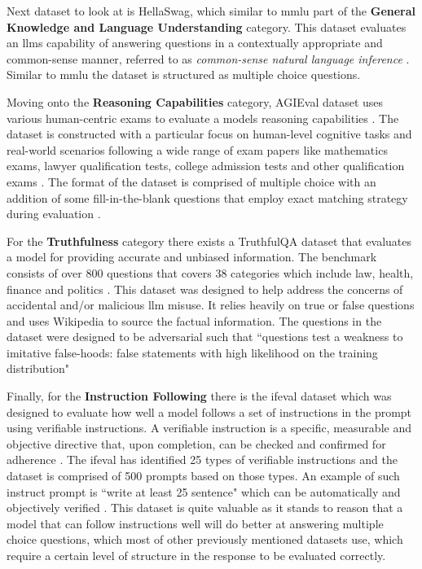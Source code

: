 \documentclass{ifacconf}
\begin{document}
	Next dataset to look at is HellaSwag, which similar to \gls{mmlu} part of the \textbf{General Knowledge and Language Understanding} category. This dataset evaluates an \glspl{llm} capability of answering questions in a contextually appropriate and common-sense manner, referred to as \textit{common-sense natural language inference} \cite{zellers2019hellaswagmachinereallyfinish}. Similar to \gls{mmlu} the dataset is structured as multiple choice questions.
	
	Moving onto the \textbf{Reasoning Capabilities} category, AGIEval dataset uses various human-centric exams to evaluate a models reasoning capabilities \cite{zhong2023agievalhumancentricbenchmarkevaluating}. The dataset is constructed with a particular focus on human-level cognitive tasks and real-world scenarios following a wide range of exam papers like mathematics exams, lawyer qualification tests, college admission tests and other qualification exams \cite[p.~5]{zhong2023agievalhumancentricbenchmarkevaluating}. The format of the dataset is comprised of multiple choice with an addition of some fill-in-the-blank questions that employ exact matching strategy during evaluation \cite[p.~6]{zhong2023agievalhumancentricbenchmarkevaluating}.
	
	For the \textbf{Truthfulness} category there exists a TruthfulQA dataset that evaluates a model for providing accurate and unbiased information. The benchmark consists of over 800 questions that covers 38 categories which include law, health, finance and politics \cite{lin2022truthfulqameasuringmodelsmimic}. This dataset was designed to help address the concerns of accidental and/or malicious \gls{llm} misuse. It relies heavily on true or false questions and uses Wikipedia to source the factual information. The questions in the dataset were designed to be adversarial such that ``questions test a weakness to imitative false-hoods: false statements with high likelihood on the training distribution" \cite[p.~4]{lin2022truthfulqameasuringmodelsmimic}
	
	Finally, for the \textbf{Instruction Following} there is the \gls{ifeval} dataset which was designed to evaluate how well a model follows a set of instructions in the prompt using verifiable instructions. A verifiable instruction is a specific, measurable and objective directive that, upon completion, can be checked and confirmed for adherence \cite{zhou2023instructionfollowingevaluationlargelanguage}. The \gls{ifeval} has identified 25 types of verifiable instructions and the dataset is comprised of 500 prompts based on those types. An example of such instruct prompt is ``write at least 25 sentence" which can be automatically and objectively verified \cite{zhou2023instructionfollowingevaluationlargelanguage}. This dataset is quite valuable as it stands to reason that a model that can follow instructions well will do better at answering multiple choice questions, which most of other previously mentioned datasets use, which require a certain level of structure in the response to be evaluated correctly.
	
\end{document}
